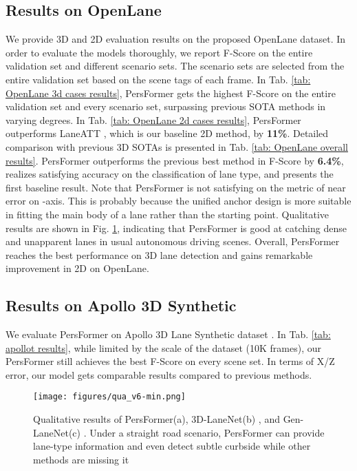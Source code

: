 \documentclass[runningheads]{llncs}
\begin{document}
\subsection{Results on OpenLane}
We provide 3D and 2D evaluation results on the proposed OpenLane dataset. 
In order to evaluate the models thoroughly, we report F-Score on the entire validation set and different scenario sets.
The scenario sets are selected from the entire validation set based on the scene tags of each frame.
In Tab. \ref{tab: OpenLane 3d cases results}, PersFormer gets the highest F-Score on the entire validation set and every scenario set, surpassing previous SOTA methods in varying degrees.
In Tab. \ref{tab: OpenLane 2d cases results}, PersFormer outperforms LaneATT \cite{tabelini2021keep}, which is our baseline 2D method, by \textbf{11\%}.
Detailed comparison with previous 3D SOTAs is presented in Tab. \ref{tab: OpenLane overall results}.
PersFormer outperforms the previous best method in F-Score by \textbf{6.4\%}, realizes satisfying accuracy on the classification of lane type, and presents the first baseline result.
Note that PersFormer is not satisfying on the metric of near error on -axis. This is probably because the unified anchor design is more suitable in fitting the main body of a lane rather than the starting point.
Qualitative results are shown in Fig. \ref{fig:qualitative},
indicating that PersFormer is good at catching dense and unapparent lanes in usual autonomous driving scenes.
Overall, PersFormer reaches the best performance on 3D lane detection and gains remarkable improvement in 2D on OpenLane.



\subsection{Results on Apollo 3D Synthetic}
We evaluate PersFormer on Apollo 3D Lane Synthetic dataset \cite{guo2020gen}.
In Tab. \ref{tab: apollot results}, while limited by the scale of the dataset (10K frames), our PersFormer still achieves the best F-Score on every scene set.
In terms of X/Z error, our model gets comparable results compared to previous methods.






\begin{figure}[t!]
    \centering
    \texttt{[image: figures/qua\_v6-min.png]}
    \caption{Qualitative results of PersFormer(a), 3D-LaneNet(b) \cite{Garnett_2019_ICCV}, and Gen-LaneNet(c) \cite{guo2020gen}. Under a straight road scenario, PersFormer can provide lane-type information and even detect subtle curbside while other methods are missing it}
    \label{fig:qualitative}
\end{figure}
\end{document}
